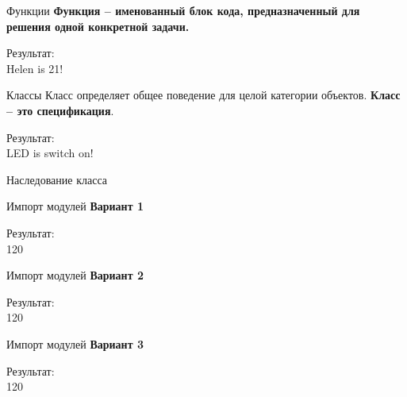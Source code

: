 \documentclass[12pt]{beamer}
\begin{document}
\begin{frame}{Функции}
\textbf{Функция -- именованный блок кода, предназначенный для решения одной конкретной задачи.} \\
\vspace{0.5cm}

\vspace{0.5cm}
Результат: \\
Helen is 21! \\
\end{frame}


\begin{frame}{Классы}
\vspace{0.2cm}
Класс определяет общее поведение для целой категории объектов. \textbf{Класс -- это спецификация}.
\vspace{0.5cm}

\vspace{0.5cm}
Результат: \\
LED is switch on!\\
\end{frame}


\begin{frame}{Наследование класса}

\end{frame}


\begin{frame}{Импорт модулей}
\textbf{Вариант 1}
\vspace{0.5cm}

\vspace{0.5cm}
Результат: \\
120 \\
\end{frame}


\begin{frame}{Импорт модулей}
\textbf{Вариант 2}
\vspace{0.5cm}

\vspace{0.5cm}
Результат: \\
120 \\
\end{frame}


\begin{frame}{Импорт модулей}
\textbf{Вариант 3}
\vspace{0.5cm}

\vspace{0.5cm}
Результат: \\
120 \\
\end{frame}
\end{document}
